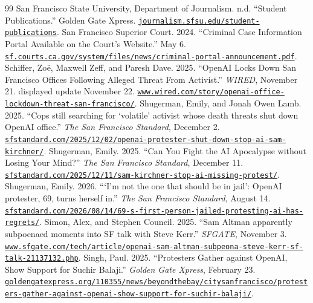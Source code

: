 \documentclass[11pt]{article}
\begin{document}
\begin{thebibliography}{99}
 San Francisco State University, Department of Journalism. n.d. ``Student Publications.'' Golden Gate Xpress. \href{https://journalism.sfsu.edu/student-publications}{\nolinkurl{journalism.sfsu.edu/student-publications}}.
 San Francisco Superior Court. 2024. ``Criminal Case Information Portal Available on the Court's Website.'' May 6. \href{https://sf.courts.ca.gov/system/files/news/criminal-portal-announcement.pdf}{\nolinkurl{sf.courts.ca.gov/system/files/news/criminal-portal-announcement.pdf}}.
 Schiffer, Zo\"e, Maxwell Zeff, and Paresh Dave. 2025. ``OpenAI Locks Down San Francisco Offices Following Alleged Threat From Activist.'' \emph{WIRED}, November 21. displayed update November 22. \href{https://www.wired.com/story/openai-office-lockdown-threat-san-francisco/}{\nolinkurl{www.wired.com/story/openai-office-lockdown-threat-san-francisco/}}.
 Shugerman, Emily, and Jonah Owen Lamb. 2025. ``Cops still searching for `volatile' activist whose death threats shut down OpenAI office.'' \emph{The San Francisco Standard}, December 2. \href{https://sfstandard.com/2025/12/02/openai-protester-shut-down-stop-ai-sam-kirchner/}{\nolinkurl{sfstandard.com/2025/12/02/openai-protester-shut-down-stop-ai-sam-kirchner/}}.
 Shugerman, Emily. 2025. ``Can You Fight the AI Apocalypse without Losing Your Mind?'' \emph{The San Francisco Standard}, December 11. \href{https://sfstandard.com/2025/12/11/sam-kirchner-stop-ai-missing-protest/}{\nolinkurl{sfstandard.com/2025/12/11/sam-kirchner-stop-ai-missing-protest/}}.
 Shugerman, Emily. 2026. ```I'm not the one that should be in jail': OpenAI protester, 69, turns herself in.'' \emph{The San Francisco Standard}, August 14. \href{https://sfstandard.com/2026/08/14/69-s-first-person-jailed-protesting-ai-has-regrets/}{\nolinkurl{sfstandard.com/2026/08/14/69-s-first-person-jailed-protesting-ai-has-regrets/}}.
 Simon, Alex, and Stephen Council. 2025. ``Sam Altman apparently subpoenaed moments into SF talk with Steve Kerr.'' \emph{SFGATE}, November 3. \href{https://www.sfgate.com/tech/article/openai-sam-altman-subpeona-steve-kerr-sf-talk-21137132.php}{\nolinkurl{www.sfgate.com/tech/article/openai-sam-altman-subpeona-steve-kerr-sf-talk-21137132.php}}.
 Singh, Paul. 2025. ``Protesters Gather against OpenAI, Show Support for Suchir Balaji.'' \emph{Golden Gate Xpress}, February 23. \href{https://goldengatexpress.org/110355/news/beyondthebay/citysanfrancisco/protesters-gather-against-openai-show-support-for-suchir-balaji/}{\nolinkurl{goldengatexpress.org/110355/news/beyondthebay/citysanfrancisco/protesters-gather-against-openai-show-support-for-suchir-balaji/}}.

\end{thebibliography}
\end{document}

